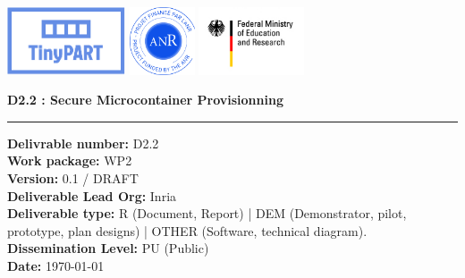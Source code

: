 \begin{titlepage}
		
			
			
			\includegraphics[height=2cm]{titlepage/Logo_TinyPART.pdf}
			\includegraphics[height=2cm]{titlepage/anr-projet-logo.jpg}
			\includegraphics[height=2cm]{titlepage/logo-bmbf.jpg}
			
			\vspace{0.5cm}

			
			\begin{center}
				\huge \bfseries D2.2 : Secure Microcontainer Provisionning
				\vspace{0.5cm}
				
				\rule{0.5\linewidth}{1pt}
			\end{center}
			
			\vspace{0.5cm}
					

			\textbf{Delivrable number: } D2.2\\
			\textbf{Work package: } WP2\\							
			\textbf{Version:} 0.1 / DRAFT\\
			\textbf{Deliverable Lead Org:} Inria\\
			\textbf{Deliverable type:} R (Document, Report) | DEM (Demonstrator, pilot, prototype, plan designs) | OTHER (Software, technical diagram).\\
			\textbf{Dissemination Level:} PU (Public) \\ %
			\textbf{Date: } \today\\


\end{titlepage}
